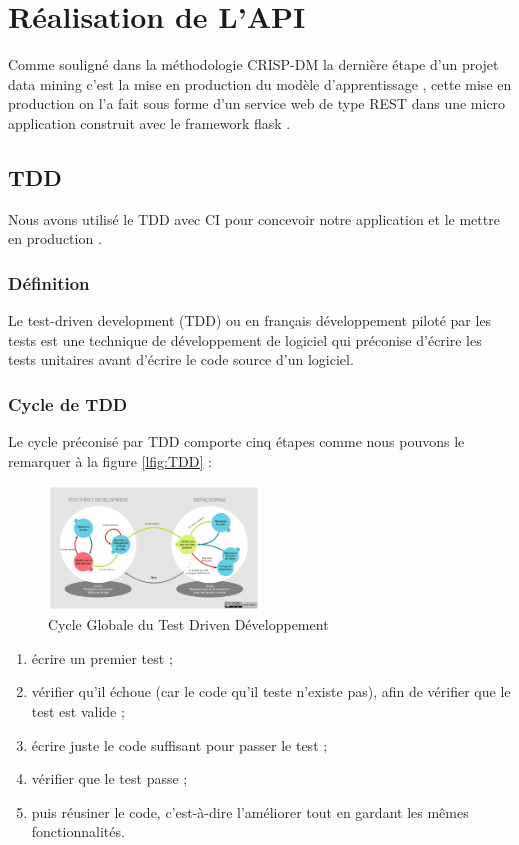 \section{Réalisation de L'\ac{API}}
Comme souligné dans la méthodologie \ac{CRISP-DM} la dernière étape d'un projet data mining c'est la mise en production du modèle d'apprentissage , cette mise en production on l'a fait sous forme d'un service web de type \ac{REST} dans une micro application construit avec le framework flask .
\subsection{\ac{TDD} \cite{TDD}} 
Nous avons utilisé le \ac{TDD} avec \ac{CI} pour concevoir notre application et le mettre en production .
\subsubsection{Définition}
Le test-driven development (TDD) ou en français développement piloté par les tests est une technique de développement de logiciel qui préconise d'écrire les tests unitaires avant d'écrire le code source d'un logiciel.
\subsubsection{Cycle de TDD}
Le cycle préconisé par TDD comporte cinq étapes comme nous pouvons le remarquer à la figure \ref{lfig:TDD}  :
\begin{figure}[ht]
	\centering
	\includegraphics[width=0.5\textwidth]{fig/Cycle-global-tdd.png}
	\caption{Cycle Globale du Test Driven Développement  }
	\label{fig:TDD}
\end{figure}  
\begin{enumerate}
	\item écrire un premier test ;
	\item vérifier qu'il échoue (car le code qu'il teste n'existe pas), afin de vérifier que le test est valide ;
	\item écrire juste le code suffisant pour passer le test ;
	\item vérifier que le test passe ;
	\item puis réusiner le code, c'est-à-dire l'améliorer tout en gardant les mêmes fonctionnalités.
\end{enumerate}
